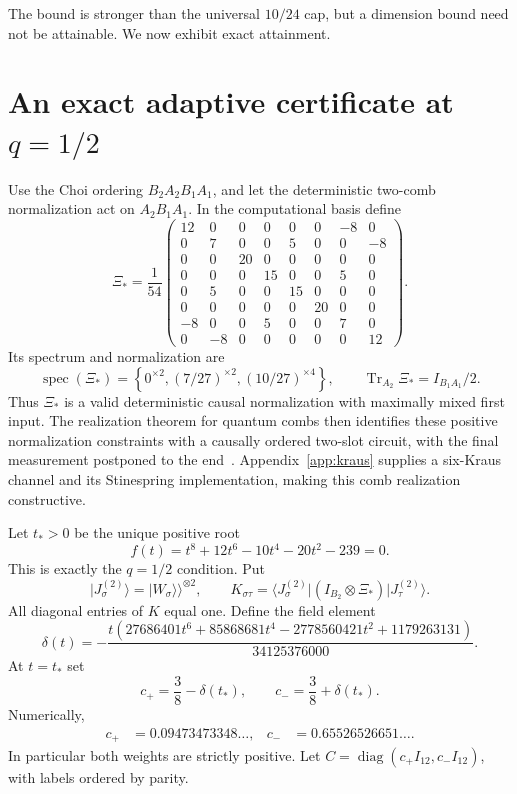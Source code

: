 \documentclass[11pt]{article}
\theoremstyle{definition}
\DeclareMathOperator{\Tr}{Tr}
\DeclareMathOperator{\diag}{diag}
\DeclareMathOperator{\spec}{spec}
\newcommand{\ket}[1]{\lvert #1\rangle}
\newcommand{\bra}[1]{\langle #1\rvert}
\begin{document}
The bound is stronger than the universal $10/24$ cap, but a dimension bound
need not be attainable.  We now exhibit exact attainment.

\section{An exact adaptive certificate at \texorpdfstring{$q=1/2$}{q=1/2}}

Use the Choi ordering $B_2A_2B_1A_1$, and let the deterministic two-comb
normalization act on $A_2B_1A_1$.  In the computational basis define
\begin{equation}\label{eq:Xi}
\Xi_*=\frac1{54}\begin{pmatrix}
12&0&0&0&0&0&-8&0\\
0&7&0&0&5&0&0&-8\\
0&0&20&0&0&0&0&0\\
0&0&0&15&0&0&5&0\\
0&5&0&0&15&0&0&0\\
0&0&0&0&0&20&0&0\\
-8&0&0&5&0&0&7&0\\
0&-8&0&0&0&0&0&12
\end{pmatrix}.
\end{equation}
Its spectrum and normalization are
\begin{equation}\label{eq:Xispec}
 \spec(\Xi_*)=\left\{0^{\times2},(7/27)^{\times2},
 (10/27)^{\times4}\right\},
 \qquad
 \Tr_{A_2}\Xi_*=I_{B_1A_1}/2.
\end{equation}
Thus $\Xi_*$ is a valid deterministic causal normalization with maximally
mixed first input.  The realization theorem for quantum combs then identifies
these positive normalization constraints with a causally ordered two-slot
circuit, with the final measurement postponed to the end~\cite{chiribella2009}.
Appendix~\ref{app:kraus} supplies a six-Kraus channel and its Stinespring
implementation, making this comb realization constructive.

Let $t_*>0$ be the unique positive root
\begin{equation}\label{eq:tpoly}
 f(t)=t^8+12t^6-10t^4-20t^2-239=0.
\end{equation}
This is exactly the $q=1/2$ condition.  Put
\[
 \ket{J_\sigma^{(2)}}=\lvert W_\sigma\rangle\!\rangle^{\otimes2},
 \qquad
 K_{\sigma\tau}=\bra{J_\sigma^{(2)}}
 (I_{B_2}\otimes\Xi_*)\ket{J_\tau^{(2)}}.
\]
All diagonal entries of $K$ equal one.  Define the field element
\[
 \delta(t)=-\frac{t(27686401t^6+85868681t^4
 -2778560421t^2+1179263131)}{34125376000}.
\]
At $t=t_*$ set
\begin{equation}\label{eq:cweights}
 c_+=\frac38-\delta(t_*),\qquad
 c_-=\frac38+\delta(t_*).
\end{equation}
Numerically,
\begin{align*}
 c_+&=0.09473473348\ldots,&
 c_-&=0.65526526651\ldots.
\end{align*}
In particular both weights are strictly positive.  Let
$C=\diag(c_+I_{12},c_-I_{12})$, with labels ordered by parity.
\end{document}
